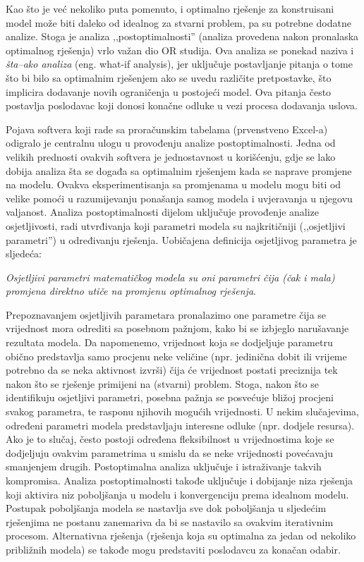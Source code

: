 \documentclass[b5paper, utf8, 11pt, colorlinks]{book}
\theoremstyle{definition}
\begin{document}
Kao što je već nekoliko puta pomenuto,  i optimalno rješenje za konstruisani model može biti daleko od idealnog za stvarni problem, pa su potrebne dodatne analize. Stoga je analiza ,,postoptimalnosti'' (analiza provedena nakon pronalaska optimalnog rješenja) vrlo važan dio OR studija.  Ova analiza se ponekad naziva i \emph{šta--ako analiza} (eng. what-if analysis), jer uključuje postavljanje pitanja o tome što bi bilo sa optimalnim rješenjem ako se uvedu različite pretpostavke, što implicira dodavanje novih ograničenja u postojeći model. Ova pitanja često postavlja poslodavac koji donosi konačne odluke u vezi procesa dodavanja uslova.  

Pojava softvera koji rade sa proračunskim tabelama (prvenstveno Excel-a) odigralo je centralnu ulogu u provođenju analize postoptimalnosti. Jedna od velikih prednosti ovakvih softvera je jednostavnost u korišćenju, gdje se lako dobija analiza šta se događa sa optimalnim rješenjem kada se naprave promjene na modelu.  Ovakva eksperimentisanja sa promjenama u modelu mogu biti od velike pomoći u razumijevanju ponašanja samog modela i uvjeravanja u njegovu valjanost.  Analiza postoptimalnosti dijelom  uključuje provođenje analize osjetljivosti, radi utvrđivanja koji parametri modela su najkritičniji (,,osjetljivi parametri'') u određivanju rješenja. Uobičajena definicija osjetljivog parametra je sljedeća:

\emph{Osjetljivi parametri matematičkog modela su oni parametri čija (čak i mala) promjena direktno utiče na promjenu optimalnog rješenja}.


Prepoznavanjem osjetljivih parametara pronalazimo one parametre čija se vrijednost mora odrediti sa posebnom pažnjom, kako bi se izbjeglo narušavanje rezultata modela. Da napomenemo, vrijednost koja se dodjeljuje parametru obično predstavlja samo procjenu neke veličine
(npr. jedinična dobit ili vrijeme potrebno da se neka aktivnost izvrši) čija će vrijednost postati preciznija tek nakon što se rješenje primijeni na (stvarni) problem. Stoga, nakon što se identifikuju osjetljivi parametri, posebna pažnja se posvećuje bližoj procjeni svakog parametra, te  rasponu njihovih mogućih vrijednosti.  U nekim slučajevima, određeni parametri modela predstavljaju interesne odluke (npr. dodjele resursa). Ako je to slučaj, često postoji određena fleksibilnost u vrijednostima koje se dodjeljuju ovakvim parametrima u smislu da se neke vrijednosti povećavaju smanjenjem drugih. Postoptimalna analiza uključuje i istraživanje takvih kompromisa. Analiza postoptimalnosti takođe uključuje i dobijanje niza rješenja koji aktivira niz poboljšanja u modelu i konvergenciju prema idealnom modelu. Postupak poboljšanja modela se nastavlja sve dok    poboljšanja u sljedećim rješenjima ne postanu zanemariva da bi se nastavilo sa ovakvim iterativnim procesom.   Alternativna rješenja (rješenja koja su optimalna za jedan od nekoliko približnih modela) se takođe mogu predstaviti poslodavcu za konačan odabir. 
\end{document}

